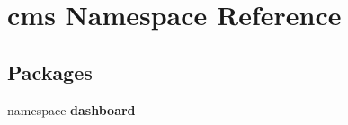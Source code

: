 \section{cms \-Namespace \-Reference}
\label{namespacecms}
\subsection*{\-Packages}
\begin{DoxyCompactItemize}
\item 
namespace {\bf dashboard}
\end{DoxyCompactItemize}
